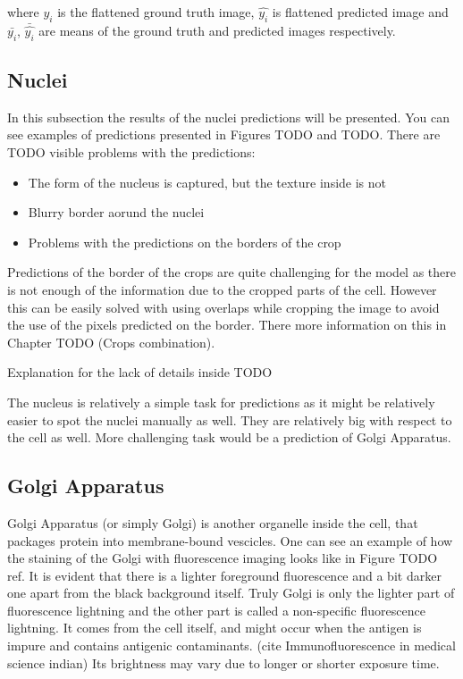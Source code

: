 where $y_i$ is the flattened ground truth image, $\hat{y_i}$ is flattened predicted image and $\bar{y_i}$, $\bar{\hat{y_i}}$ are means of the ground truth and predicted images respectively.

\subsection{Nuclei}
In this subsection the results of the nuclei predictions will be presented. You can see examples of predictions presented in Figures TODO and TODO. There are TODO visible problems with the predictions:
\begin{itemize}
    \item The form of the nucleus is captured, but the texture inside is not
    \item Blurry border aorund the nuclei
    \item Problems with the predictions on the borders of the crop
\end{itemize}
Predictions of the border of the crops are quite challenging for the model as there is not enough of the information due to the cropped parts of the cell. However this can be easily solved with using overlaps while cropping the image to avoid the use of the pixels predicted on the border. There more information on this in Chapter TODO (Crops combination).

Explanation for the lack of details inside TODO

The nucleus is relatively a simple task for predictions as it might be relatively easier to spot the nuclei manually as well. They are relatively big with respect to the cell as well. More challenging task would be a prediction of Golgi Apparatus.

\subsection{Golgi Apparatus}
Golgi Apparatus (or simply Golgi) is another organelle inside the cell, that packages protein into membrane-bound vescicles. One can see an example of how the staining of the Golgi with fluorescence imaging looks like in Figure TODO ref. It is evident that there is a lighter foreground fluorescence and a bit darker one apart from the black background itself. Truly Golgi is only the lighter part of fluorescence lightning and the other part is called a non-specific fluorescence lightning. It comes from the cell itself, and might occur when the antigen is impure and contains antigenic contaminants. (cite Immunofluorescence in medical science indian) Its brightness may vary due to longer or shorter exposure time. 

